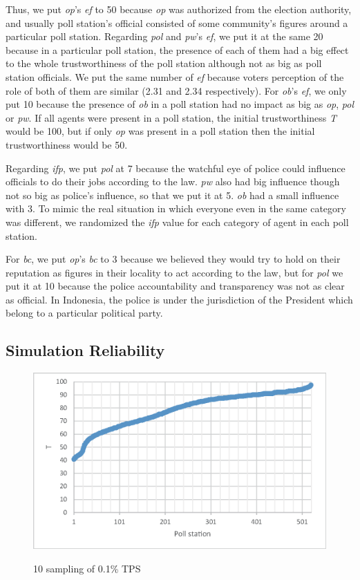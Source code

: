 \documentclass[JIP]{ipsj}
\begin{document}
Thus, we put \textit{op}'s \textit{ef} to 50 because \textit{op} was authorized from the election authority, and usually poll station's official consisted of some community's figures around a particular poll station. Regarding \textit{pol} and \textit{pw}'s \textit{ef}, we put it at the same 20 because in a particular poll station, the presence of each of them had a big effect to the whole trustworthiness of the poll station although not as big as poll station officials. We put the same number of \textit{ef} because voters perception of the role of both of them are similar (2.31 and 2.34 respectively). For \textit{ob}'s \textit{ef}, we only put 10 because the presence of \textit{ob} in a poll station had no impact as big as \textit{op}, \textit{pol} or \textit{pw}. If all agents were present in a poll station, the initial trustworthiness \textit{T} would be 100, but if only \textit{op} was present in a poll station then the initial trustworthiness would be 50.

Regarding \textit{ifp}, we put \textit{pol} at 7 because the watchful eye of police could influence officials to do their jobs according to the law. \textit{pw} also had big influence though not so big as police's influence, so that we put it at 5. \textit{ob} had a small influence with 3. To mimic the real situation in which everyone even in the same category was different, we randomized the \textit{ifp} value for each category of agent in each poll station.

For \textit{bc}, we put \textit{op}'s \textit{bc} to 3 because we believed they would try to hold on their reputation as figures in their locality to act according to the law, but for \textit{pol} we put it at 10 because the police accountability and transparency was not as clear as official. In Indonesia, the police is under the jurisdiction of the President which belong to a particular political party.


\subsection{Simulation Reliability}%

\begin{figure}[tb]%
\vbox{\it
  \hbox{\includegraphics[scale=0.6]{images/graph-sampling100.eps}}}
\centerline{}
\caption{10 sampling of 0.1\% TPS}
\label{fig:sampling100}
\end{figure}
\end{document}

